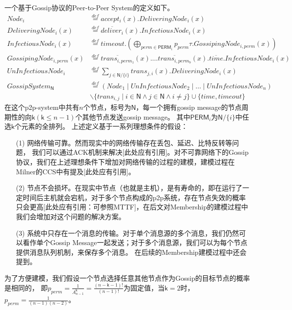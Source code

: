 一个基于Gossip协议的Peer-to-Peer System的定义如下。
\begin{align*}
   Node_i& \stackrel{def}{=} accept_i(x).DeliveringNode_i(x)\\
   DeliveringNode_i(x) &\stackrel{def}{=} \overline{deliver_i}(x).InfectiousNode_i(x)\\
   InfectiousNode_i(x)&\stackrel{def}{=}timeout.(\bigoplus_{perm\in \mathsf{PERM}_i} p_{perm}\tau.GossipingNode_{i,perm}(x))\\
   GossipingNode_{i,perm}(x)&\stackrel{def}{=}\overline{trans_{i,perm_{1}}}(x).\dots \overline{trans_{i,perm_{b}}}(x).\overline{time}.InfectiousNode_i(x)\\
   UnInfectiousNode_i &\stackrel{def}{=} \sum_{j\in \mathsf{N}/\{i\}}trans_{j,i}(x).DeliveringNode_i(x)\\
   GossipSystem_\mathsf{N}&\stackrel{def}{=}(Node_1\mid UnInfectiousNode_2\mid \dots \mid UnInfectiousNode_n)\\
   &\backslash \{trans_{i,j}\mid i\in \mathsf{N} \wedge j\in \mathsf{N} \wedge i\neq j\}\cup \{time, timeout\}
\end{align*}
在这个p2p-system中共有$n$个节点，标号为$\mathsf{N}$，每一个拥有gossip message的节点周期性的向$\mathsf{k}(\mathsf{k}\leq n-1)$个其他节点发送gossip message。
其中$\mathsf{PERM}_i$为$\mathsf{N}/\{i\}$中任选$\mathsf{k}$个元素的全排列。
上述定义基于一系列理想条件的假设：
\begin{itemize}
   \item [(1)] {网络传输可靠。然而现实中的网络传输存在丢包、延迟、比特反转等问题，
   我们可以通过ACK机制来解决[此处应有引用]。对不可靠网络下的Gossip协议，我们在上述理想条件下增加对网络传输的过程的建模，建模过程在Milner的CCS中有提及[此处应有引用]。}
   \item [(2)] {节点不会损坏。在现实中节点（也就是主机），是有寿命的，即在运行了一定时间后主机就会宕机，对于多个节点构成的p2p系统，存在节点失效的概率只会更高[此处应有引用：可参照MTTF]，在后文对Membership的建模过程中我们会增加对这个问题的解决方案。}
   \item [(3)] {系统中只存在一个消息的传输。对于单个消息源的多个消息，我们仍然可以看作单个Gossip Message一起发送；对于多个消息源，我们可以为每个节点提供消息队列机制，来保存多个消息。
   在后续的Membership建模过程中还会提到。}
\end{itemize}

为了方便建模，我们假设一个节点选择任意其他节点作为Gossip的目标节点的概率是相同的，
即$p_{perm} = \frac{1}{A_{n-1}^{\mathsf{k}}} = \frac{(n-\mathsf{k}-1)!}{(n-1)!}$为固定值，当$\mathsf{k}=2$时，$p_{perm} = \frac{1}{(n-1)(n-2)}$。

